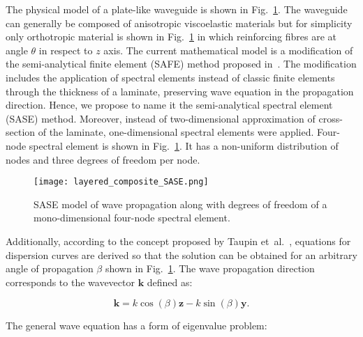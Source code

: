 \documentclass[preprint,12pt]{elsarticle}
\newcommand{\vect}[1]{\mathbf{#1}} %
\begin{document}
	The physical model of a plate-like waveguide is shown in 
	Fig.~\ref{fig:layered_composite_SASE}.  The waveguide can generally be composed 
	of anisotropic viscoelastic materials but for simplicity only orthotropic material is 
	shown in Fig.~\ref{fig:layered_composite_SASE} in which reinforcing fibres are at 
	angle \(\theta\) in respect to \(z\) axis. The current mathematical model is a 
	modification of the semi-analytical finite element (SAFE) method proposed 
	in~\cite{Bartoli2006}. The modification includes the application of spectral elements 
	instead of classic finite elements through the thickness of a laminate, preserving 
	wave equation in the propagation direction. Hence, we propose to name it the 
	semi-analytical spectral element (SASE) method. Moreover, instead of 
	two-dimensional approximation of cross-section of the laminate, one-dimensional 
	spectral elements were applied. Four-node spectral element is shown in 
	Fig.~\ref{fig:layered_composite_SASE}. It has a non-uniform distribution of nodes 
	and three degrees of freedom per node.
	
		\begin{figure} [h!]
		\centering
		\texttt{[image: layered\_composite\_SASE.png]}
		\caption{SASE model of wave propagation along with degrees of freedom of a 
		mono-dimensional 
four-node spectral element.}
		\label{fig:layered_composite_SASE}
	\end{figure}
	
	Additionally, according to the concept proposed by Taupin et~al.~\cite{Taupin2011}, 
	equations for dispersion curves are derived so that the solution can be obtained for 
	an arbitrary angle of propagation \(\beta\) shown in 
	Fig.~\ref{fig:layered_composite_SASE}. The wave propagation direction corresponds 
	to the wavevector \(\vect{k}\) defined as:
	
	\begin{equation}
	  \vect{k} = k \cos (\beta) \vect{z} - k \sin (\beta) \vect{y}.
		\label{eq:wavevector}
	\end{equation}
	
   The general wave equation has a form of eigenvalue problem:
\end{document}
